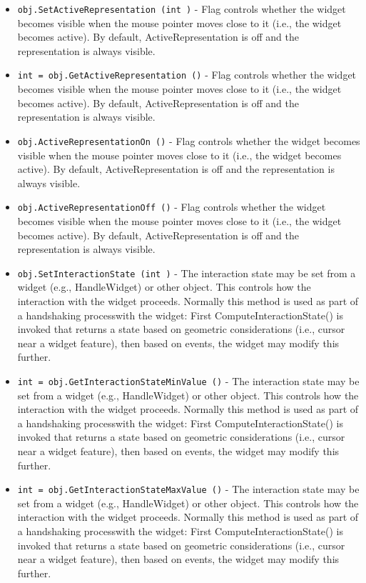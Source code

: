 \begin{itemize}
\item  \verb|obj.SetActiveRepresentation (int )| -  Flag controls whether the widget becomes visible when the mouse pointer
 moves close to it (i.e., the widget becomes active). By default,
 ActiveRepresentation is off and the representation is always visible.

\item  \verb|int = obj.GetActiveRepresentation ()| -  Flag controls whether the widget becomes visible when the mouse pointer
 moves close to it (i.e., the widget becomes active). By default,
 ActiveRepresentation is off and the representation is always visible.

\item  \verb|obj.ActiveRepresentationOn ()| -  Flag controls whether the widget becomes visible when the mouse pointer
 moves close to it (i.e., the widget becomes active). By default,
 ActiveRepresentation is off and the representation is always visible.

\item  \verb|obj.ActiveRepresentationOff ()| -  Flag controls whether the widget becomes visible when the mouse pointer
 moves close to it (i.e., the widget becomes active). By default,
 ActiveRepresentation is off and the representation is always visible.

\item  \verb|obj.SetInteractionState (int )| -  The interaction state may be set from a widget (e.g., HandleWidget) or
 other object. This controls how the interaction with the widget
 proceeds. Normally this method is used as part of a handshaking
 processwith the widget: First ComputeInteractionState() is invoked that
 returns a state based on geometric considerations (i.e., cursor near a
 widget feature), then based on events, the widget may modify this
 further.

\item  \verb|int = obj.GetInteractionStateMinValue ()| -  The interaction state may be set from a widget (e.g., HandleWidget) or
 other object. This controls how the interaction with the widget
 proceeds. Normally this method is used as part of a handshaking
 processwith the widget: First ComputeInteractionState() is invoked that
 returns a state based on geometric considerations (i.e., cursor near a
 widget feature), then based on events, the widget may modify this
 further.

\item  \verb|int = obj.GetInteractionStateMaxValue ()| -  The interaction state may be set from a widget (e.g., HandleWidget) or
 other object. This controls how the interaction with the widget
 proceeds. Normally this method is used as part of a handshaking
 processwith the widget: First ComputeInteractionState() is invoked that
 returns a state based on geometric considerations (i.e., cursor near a
 widget feature), then based on events, the widget may modify this
 further.


\end{itemize}

